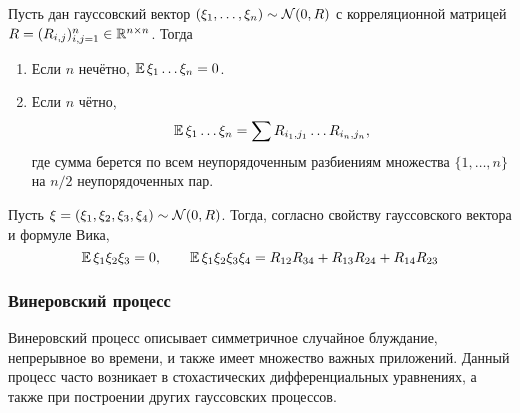 \begin{theorem}
    \label{theorem:special:Wick_formula}
    Пусть дан гауссовский вектор $ (\xi_1, \ldots, \xi_n) \sim \mathcal{N}(0, R) $
    с корреляционной матрицей $ R = (R_{i,j})_{i,j=1}^n \in \mathbb{R}^{n \times n} $.
    Тогда
    \begin{enumerate}
        \item
            Если $ n $ нечётно, $ \operatorname{\mathbb{E}} \xi_1 \ldots \xi_n = 0 $.
        \item
            Если $ n $ чётно,
            \[
                \operatorname{\mathbb{E}} \xi_1 \ldots \xi_n = \sum R_{i_1, j_1} \ldots R_{i_n, j_n},
            \]
            где сумма берется по всем неупорядоченным разбиениям множества $ \{1, \ldots, n \} $ на $ n/2 $ неупорядоченных пар.
    \end{enumerate}
\end{theorem}

\begin{example}
    \label{example:special:Wick_formula}
    Пусть $ \xi = (\xi_1, \xi_2, \xi_3, \xi_4) \sim \mathcal{N}(0, R) $.
    Тогда, согласно свойству гауссовского вектора и формуле Вика,
    \[
        \operatorname{\mathbb{E}} \xi_1 \xi_2 \xi_3 = 0, \qquad
        \operatorname{\mathbb{E}} \xi_1 \xi_2 \xi_3 \xi_4 = R_{12} R_{34} + R_{13} R_{24} + R_{14} R_{23}
    \]
\end{example}



\subsubsection{Винеровский процесс} \label{subsubsection:special:Wiener}

Винеровский процесс описывает симметричное случайное блуждание, непрерывное во времени,
и также имеет множество важных приложений.
Данный процесс часто возникает в стохастических дифференциальных уравнениях,
а также при построении других гауссовских процессов.

